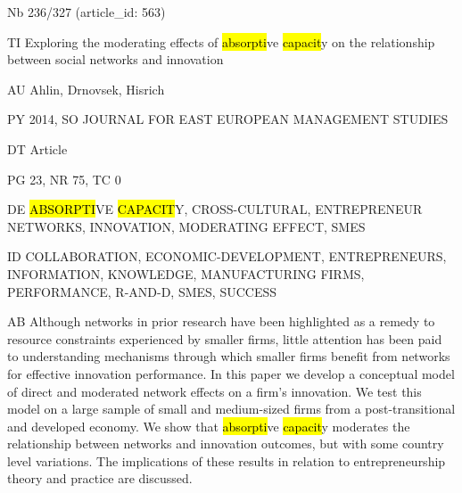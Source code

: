 \documentclass[a4paper]{article}
\begin{document}
\vspace*{-2cm}
Nb \tabto{0cm}236/327 (article\_id: 563)\par
TI \tabto{0cm}Exploring the moderating effects of \hl{absorpti}ve \hl{capacit}y on the relationship between social networks and innovation\par
AU \tabto{0cm}Ahlin, Drnovsek, Hisrich\par
PY \tabto{0cm}2014, SO JOURNAL FOR EAST EUROPEAN MANAGEMENT STUDIES\par
DT \tabto{0cm}Article\par
PG \tabto{0cm}23, NR 75, TC 0\par
DE \tabto{0cm}\hl{ABSORPTI}VE \hl{CAPACIT}Y, CROSS-CULTURAL, ENTREPRENEUR NETWORKS, INNOVATION, MODERATING EFFECT, SMES\par
ID \tabto{0cm}COLLABORATION, ECONOMIC-DEVELOPMENT, ENTREPRENEURS, INFORMATION, KNOWLEDGE, MANUFACTURING FIRMS, PERFORMANCE, R-AND-D, SMES, SUCCESS\par
AB \tabto{0cm}Although networks in prior research have been highlighted as a remedy to resource constraints experienced by smaller firms, little attention has been paid to understanding mechanisms through which smaller firms benefit from networks for effective innovation performance. In this paper we develop a conceptual model of direct and moderated network effects on a firm's innovation. We test this model on a large sample of small and medium-sized firms from a post-transitional and developed economy. We show that \hl{absorpti}ve \hl{capacit}y moderates the relationship between networks and innovation outcomes, but with some country level variations. The implications of these results in relation to entrepreneurship theory and practice are discussed.\par
\clearpage
\end{document}

